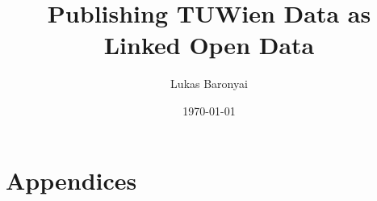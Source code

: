 \documentclass[pdftex,a4paper,10pt]{article}
\begin{document}
\pagestyle{plain}
\setlength{\tabcolsep}{10pt}
\title{Publishing TUWien Data as Linked Open Data}
\author{Lukas Baronyai}
\date{\today}
\maketitle					%
\tableofcontents 	%
\cleardoublepage %
\listoffigures








\appendix

\cleardoublepage
{}
{}



\chapter{Appendices}

\end{document}
